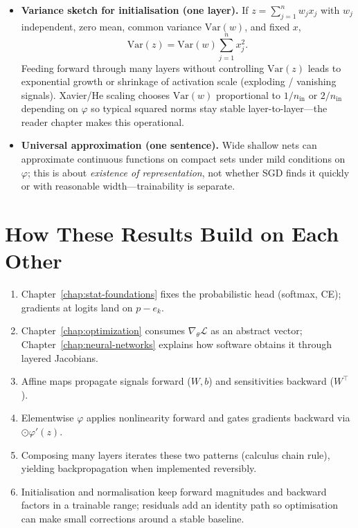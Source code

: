 \begin{itemize}[leftmargin=1.5em]
  \item \textbf{Variance sketch for initialisation (one layer).}
  If \(z=\sum_{j=1}^{n} w_j x_j\) with \(w_j\) independent, zero mean, common variance \(\mathrm{Var}(w)\), and fixed \(x\),
  \[
    \mathrm{Var}(z)=\mathrm{Var}(w)\sum_{j=1}^{n} x_j^2.
  \]
  Feeding forward through many layers without controlling \(\mathrm{Var}(z)\) leads to exponential growth or shrinkage of activation scale (exploding / vanishing signals). Xavier/He scaling chooses \(\mathrm{Var}(w)\) proportional to \(1/n_{\mathrm{in}}\) or \(2/n_{\mathrm{in}}\) depending on \(\varphi\) so typical squared norms stay stable layer-to-layer---the reader chapter makes this operational.

  \item \textbf{Universal approximation (one sentence).}
  Wide shallow nets can approximate continuous functions on compact sets under mild conditions on \(\varphi\); this is about \emph{existence of representation}, not whether SGD finds it quickly or with reasonable width---trainability is separate.
\end{itemize}

\section*{How These Results Build on Each Other}
\begin{enumerate}[leftmargin=1.5em]
  \item Chapter~\ref{chap:stat-foundations} fixes the probabilistic head (softmax, CE); gradients at logits land on \(p-e_k\).
  \item Chapter~\ref{chap:optimization} consumes \(\nabla_\theta \mathcal{L}\) as an abstract vector; Chapter~\ref{chap:neural-networks} explains how software obtains it through layered Jacobians.
  \item Affine maps propagate signals forward (\(W,b\)) and sensitivities backward (\(W^{\top}\)).
  \item Elementwise \(\varphi\) applies nonlinearity forward and gates gradients backward via \(\odot \varphi'(z)\).
  \item Composing many layers iterates these two patterns (calculus chain rule), yielding backpropagation when implemented reversibly.
  \item Initialisation and normalisation keep forward magnitudes and backward factors in a trainable range; residuals add an identity path so optimisation can make small corrections around a stable baseline.
\end{enumerate}

